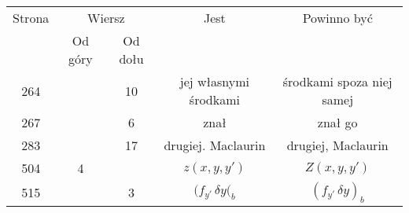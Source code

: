 \documentclass[a4paper,11pt]{article}
\numberwithin{equation}{section}
\begin{document}
































\begin{center}

  \begin{tabular}{|c|c|c|c|c|}
    \hline
    Strona & \multicolumn{2}{c|}{Wiersz} & Jest
                              & Powinno być \\ \cline{2-3}
    & Od góry & Od dołu & & \\
    \hline
    264 & & 10 & jej własnymi środkami & środkami spoza niej samej \\
    267 & & \hphantom{0}6 & znał & znał go \\
    283 & & 17 & drugiej. Maclaurin & drugiej, Maclaurin \\
    504 & \hphantom{0}4 & & $z( x, y, y' )$ & $Z( x, y, y' )$ \\
    515 & & \hphantom{0}3 & $( f_{ y' } \, \delta y(_{ b }$
    & $( f_{ y' } \, \delta y )_{ b }$ \\
    \hline
  \end{tabular}

\end{center}
\end{document}

